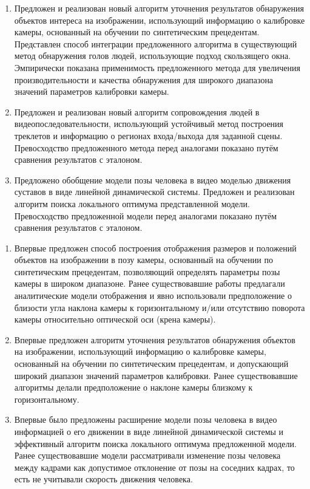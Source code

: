 {}
\begin{enumerate}
	\item Предложен и реализован новый алгоритм уточнения результатов обнаружения объектов интереса на изображении, использующий информацию о калибровке камеры, основанный на обучении по синтетическим прецедентам. Представлен способ интеграции предложенного алгоритма в существующий метод обнаружения голов людей, использующие подход скользящего окна. Эмпирически показана применимость предложенного метода для увеличения производительности и качества обнаружения для широкого диапазона значений параметров калибровки камеры.
	\item Предложен и реализован новый алгоритм сопровождения людей в видеопоследовательности, использующий устойчивый метод построения треклетов и информацию о регионах входа/выхода для заданной сцены. Превосходство предложенного метода перед аналогами показано путём сравнения результатов с эталоном.
	\item Предложено обобщение модели позы человека в видео моделью движения суставов в виде линейной динамической системы. Предложен и реализован алгоритм поиска локального оптимума представленной модели. Превосходство предложенной модели перед аналогами показано путём сравнения результатов с эталоном. 
\end{enumerate}

{\novelty}
\begin{enumerate}
  \item Впервые предложен способ построения отображения размеров и положений объектов на изображении в позу камеры, основанный на обучении по синтетическим прецедентам, позволяющий определять параметры позы камеры в широком диапазоне. Ранее существовавшие работы предлагали аналитические модели отображения и явно использовали предположение о близости угла наклона камеры к горизонтальному и/или отсутствию поворота камеры относительно оптической оси (крена камеры).
  \item Впервые предложен алгоритм уточнения результатов обнаружения объектов на изображении, использующий информацию о калибровке камеры, основанный на обучении по синтетическим прецедентам, и допускающий широкий диапазон значений параметров калибровки. Ранее существовавшие алгоритмы делали предположение о наклоне камеры близкому к горизонтальному.
  \item Впервые было предложены расширение модели позы человека в видео информацией о его движении в виде линейной динамической системы и эффективный алгоритм поиска локального оптимума предложенной модели. Ранее существовавшие модели рассматривали изменение позы человека между кадрами как допустимое отклонение от позы на соседних кадрах, то есть не учитывали скорость движения человека.
\end{enumerate}


